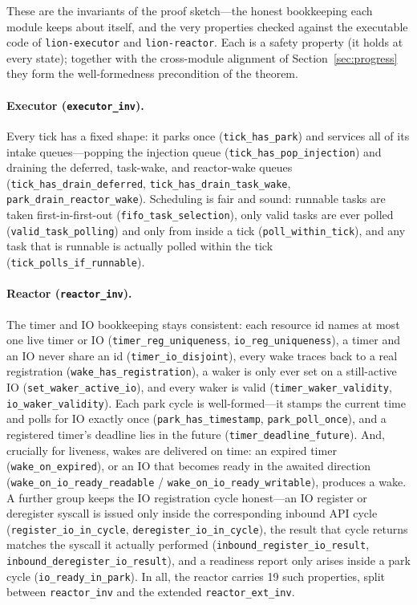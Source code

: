 \documentclass[11pt]{article}
\newcommand{\inv}[1]{\textcolor{cInv}{#1}}
\theoremstyle{plain}
\theoremstyle{definition}
\begin{document}
These are the \inv{invariants} of the proof sketch---the honest bookkeeping each module keeps
about itself, and the very properties checked against the executable code of
\texttt{lion-executor} and \texttt{lion-reactor}. Each is a safety property (it holds at
every state); together with the cross-module alignment of Section~\ref{sec:progress} they
form the well-formedness precondition of the theorem.

\paragraph{Executor (\texttt{executor\_inv}).} Every tick has a fixed shape: it parks once
(\lstinline|tick_has_park|) and services all of its intake queues---popping the injection
queue (\lstinline|tick_has_pop_injection|) and draining the deferred, task-wake, and
reactor-wake queues (\lstinline|tick_has_drain_deferred|, \lstinline|tick_has_drain_task_wake|,
\lstinline|park_drain_reactor_wake|). Scheduling is fair and sound: runnable tasks are taken
first-in-first-out (\lstinline|fifo_task_selection|), only valid tasks are ever polled
(\lstinline|valid_task_polling|) and only from inside a tick
(\lstinline|poll_within_tick|), and any task that is runnable is actually polled within the
tick (\lstinline|tick_polls_if_runnable|).

\paragraph{Reactor (\texttt{reactor\_inv}).} The timer and IO bookkeeping stays consistent:
each resource id names at most one live timer or IO (\lstinline|timer_reg_uniqueness|,
\lstinline|io_reg_uniqueness|), a timer and an IO never share an id
(\lstinline|timer_io_disjoint|), every wake traces back to a real registration
(\lstinline|wake_has_registration|), a waker is only ever set on a still-active IO
(\lstinline|set_waker_active_io|), and every waker is valid
(\lstinline|timer_waker_validity|, \lstinline|io_waker_validity|). Each park cycle is
well-formed---it stamps the current time and polls for IO exactly once
(\lstinline|park_has_timestamp|, \lstinline|park_poll_once|), and a registered timer's
deadline lies in the future (\lstinline|timer_deadline_future|). And, crucially for liveness,
wakes are delivered on time: an expired timer (\lstinline|wake_on_expired|), or an IO that
becomes ready in the awaited direction (\lstinline|wake_on_io_ready_readable| /
\lstinline|wake_on_io_ready_writable|), produces a wake. A further group keeps the IO
registration cycle honest---an IO register or deregister syscall is issued only inside the
corresponding inbound API cycle (\lstinline|register_io_in_cycle|,
\lstinline|deregister_io_in_cycle|), the result that cycle returns matches the syscall it
actually performed (\lstinline|inbound_register_io_result|,
\lstinline|inbound_deregister_io_result|), and a readiness report only arises inside a park
cycle (\lstinline|io_ready_in_park|). In all, the reactor carries 19 such properties, split
between \texttt{reactor\_inv} and the extended \texttt{reactor\_ext\_inv}.
\end{document}
